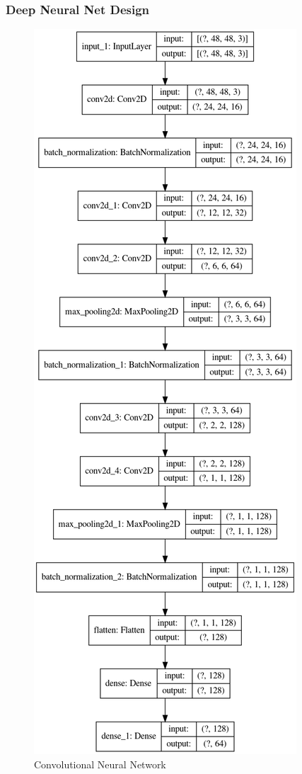 \documentclass{article}
\begin{document}
\subsubsection{Deep Neural Net Design}

\begin{figure}[H]
\centering
\includegraphics[scale=0.3]{feature_net}
\caption{Convolutional Neural Network}
\label{cnnfig}
\end{figure}
\end{document}
